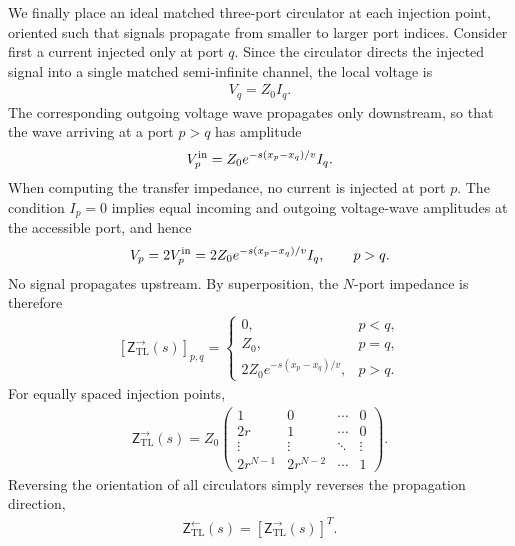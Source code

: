 \documentclass[prx,aps,twocolumn,article]{revtex4-2}
\newcommand{\msf}[1]{\mathsf{#1}}
\newcommand{\msZ}{\msf{Z}}
\newcommand{\msZTL}{\msZ_{\mathrm{TL}}}
\begin{document}
We finally place an ideal matched three-port circulator at each injection
point, oriented such that signals propagate from smaller to larger port
indices. Consider first a current injected only at port $q$. Since the circulator directs the injected signal into a single matched semi-infinite
channel, the local voltage is
\begin{align}
    V_q=Z_0I_q.
\end{align}
The corresponding outgoing voltage wave propagates only downstream, so that the wave arriving at a port $p>q$ has amplitude
\begin{align}
    V_{p}^{\rm in}
    =
    Z_0
    e^{-s(x_p-x_q)/v}
    I_q.
\end{align}
When computing the transfer impedance, no current is injected at port $p$.
The condition $I_p=0$ implies equal incoming and outgoing voltage-wave
amplitudes at the accessible port, and hence
\begin{align}
    V_p
    =
    2V_p^{\rm in}
    =
    2Z_0
    e^{-s(x_p-x_q)/v}
    I_q,
    \qquad
    p>q.
\end{align}
No signal propagates upstream. By superposition, the $N$-port impedance is
therefore
\begin{align}
    \left[\msZTL^{\rightarrow}(s)\right]_{p,q}
    =
    \begin{cases}
        0,
        & p<q,
        \\[1mm]
        Z_0,
        & p=q,
        \\[1mm]
        2Z_0e^{-s(x_p-x_q)/v},
        & p>q.
    \end{cases}
    \label{Eq:InfiniteTLNPortCirculators}
\end{align}
For equally spaced injection points,
\begin{align}
    \msZTL^{\rightarrow}(s)
    =
    Z_0
    \begin{pmatrix}
        1&0&\cdots&0\\
        2r&1&\cdots&0\\
        \vdots&\vdots&\ddots&\vdots\\
        2r^{N-1}&2r^{N-2}&\cdots&1
    \end{pmatrix}.
    \label{Eq:InfiniteTLNPortCirculatorsEquallySpaced}
\end{align}
Reversing the orientation of all circulators simply reverses the propagation
direction,
\begin{align}
    \msZTL^{\leftarrow}(s)
    =
    \left[
        \msZTL^{\rightarrow}(s)
    \right]^T.
\end{align}
\end{document}
